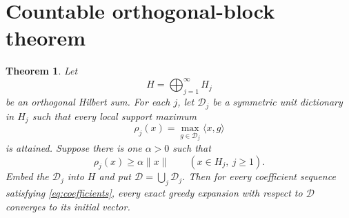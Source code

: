 \documentclass[11pt]{article}
\newtheorem{theorem}{Theorem}
\newcommand{\D}{\mathcal D}
\begin{document}
\section{Countable orthogonal-block theorem}

\begin{theorem}\label{thm:block}
Let
\[
 H=\bigoplus_{j=1}^{\infty}H_j
\]
be an orthogonal Hilbert sum.  For each $j$, let $\D_j$ be a symmetric unit
dictionary in $H_j$ such that every local support maximum
\[
 \rho_j(x)=\max_{g\in\D_j}\langle x,g\rangle
\]
is attained.  Suppose there is one $\alpha>0$ such that
\begin{equation}\label{eq:width}
 \rho_j(x)\ge\alpha\|x\|\qquad(x\in H_j,\ j\ge1).
\end{equation}
Embed the $\D_j$ into $H$ and put $\D=\bigcup_j\D_j$.  Then for every
coefficient sequence satisfying \eqref{eq:coefficients}, every exact greedy
expansion with respect to $\D$ converges to its initial vector.
\end{theorem}
\end{document}
